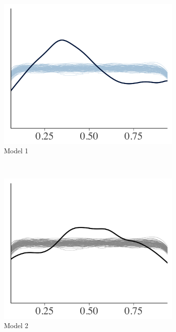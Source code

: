 \documentclass{statsoc}
\begin{document}
\begin{figure}
\centering
\begin{subfigure}{0.31\textwidth}
\includegraphics[width=\textwidth]{ppc_loo_pit_overlay1.png}
\caption{Model 1}
\label{fig:ppc_loo_pit_unif0}
\end{subfigure}
~
\begin{subfigure}{0.31\textwidth}
\includegraphics[width=\textwidth]{ppc_loo_pit_overlay2.png}
\caption{Model 2}
\label{fig:ppc_loo_pit_unif2}
\end{subfigure}
~
\begin{subfigure}{0.31\textwidth}

\end{subfigure}
\end{figure}
\end{document}
